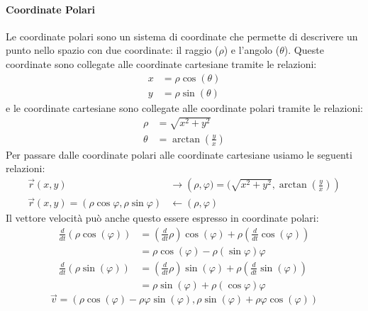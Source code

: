         \paragraph{Coordinate Polari}
            Le coordinate polari sono un sistema di coordinate che permette di descrivere un punto nello spazio con due coordinate: il raggio ($\rho$) e l'angolo ($\theta$). Queste coordinate sono collegate alle coordinate cartesiane tramite le relazioni:
            $$
                \begin{aligned}
                    x &= \rho\cos(\theta)\\
                    y &= \rho\sin(\theta)
                \end{aligned}
            $$
            e le coordinate cartesiane sono collegate alle coordinate polari tramite le relazioni:
            $$
                \begin{aligned}
                    \rho &= \sqrt{x^2+y^2}\\
                    \theta &= \arctan\left(\frac{y}{x}\right)
                \end{aligned}
            $$
            Per passare dalle coordinate polari alle coordinate cartesiane usiamo le seguenti relazioni:
            $$
                \begin{aligned}
                    \vec{r}(x,y) & \rightarrow\left(\rho,\varphi)=(\sqrt{x^2+y^2},\arctan\left(\frac{y}{x}\right)\right)\\
                    \vec{r}(x,y)=(\rho\cos{\varphi},\rho\sin{\varphi}) & \leftarrow(\rho,\varphi)
                \end{aligned}
            $$
            Il vettore velocità può anche questo essere espresso in coordinate polari: $$
                \begin{aligned}
                    \frac{d}{dt}(\rho\cos(\varphi)) &= \left(\frac{d}{dt}\rho\right)\cos(\varphi) + \rho\left(\frac{d}{dt}\cos(\varphi)\right) \\
                    &= \rho\cos(\varphi)-\rho(\sin\varphi)\varphi\\
                    \frac{d}{dt}(\rho\sin(\varphi)) &= \left(\frac{d}{dt}\rho\right)\sin(\varphi) + \rho\left(\frac{d}{dt}\sin(\varphi)\right) \\
                    &= \rho\sin(\varphi)+\rho(\cos\varphi)\varphi
                \end{aligned}
                $$
            $$
                \vec{v}=\left(\rho\cos(\varphi)-\rho\varphi\sin(\varphi), \rho\sin(\varphi)+\rho\varphi\cos(\varphi)\right)
            $$
